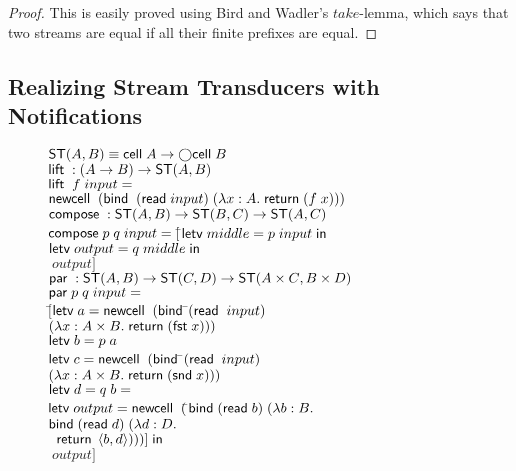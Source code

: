 \begin{proof}
  This is easily proved using Bird and Wadler's $take$-lemma, which
  says that two streams are equal if all their finite prefixes are
  equal.
\end{proof}


\subsection{Realizing Stream Transducers with Notifications}

\begin{figure}
\mbox{}
\begin{tabbing}
$\mathsf{ST}({A}, {B}) \equiv \mathsf{cell}\;{A} \to \bigcirc{\mathsf{cell}\;{B}}$ \\[1em]

$\mathsf{lift}\; : (A \to B) \to \mathsf{ST}({A}, {B})$ \\
$\mathsf{lift}\;\;f\;input = $ \\
\;\; $\mathsf{newcell}\;\; (\mathsf{bind}\;\;(\mathsf{read}\; input)\; (\lambda x:A.\;\mathsf{return}\; (f\;x)))$ \\[1em]

$\mathsf{compose}\; : \mathsf{ST}({A}, {B}) \to \mathsf{ST}({B}, {C}) \to \mathsf{ST}({A}, {C})$ \\
$\mathsf{compose}\; p\;q\;input = [$\=$\letv{middle}{p\;input}$ \\
                            \>$\letv{output}{q\;middle}$ \\ 
                            \>$\;output]$ \\[1em]

$\mathsf{par}\; : \mathsf{ST}({A}, {B}) \to \mathsf{ST}({C}, {D}) \to \mathsf{ST}({A \times C}, {B \times D})$ \\
$\mathsf{par}\; p \; q \; input = $ \\
\;\;$[$\=$\mathsf{letv}\;a = \mathsf{newcell}\;\; (\mathsf{bind}\;$\=$(\mathsf{read}\;\;input)$ \\
     \>                                   \>$(\lambda x:A\times B.\;\mathsf{return}\; (\mathsf{fst}\; x)))$ \\
     \>$\mathsf{letv}\;b = {p\;a}{}$ \\
     \>$\mathsf{letv}\;c = \mathsf{newcell}\;\; (\mathsf{bind}\;$\=$(\mathsf{read}\;\;input)\;$\\ 
     \>                                   \>$(\lambda x:A\times B.\;\mathsf{return}\; (\mathsf{snd}\; x)))$ \\
     \>$\mathsf{letv}\;d = {q\;b} = $ \\
     \>$\mathsf{letv}\;output = \mathsf{newcell}\;\; ($\=$\mathsf{bind}\; (\mathsf{read}\; b)\; (\lambda b:B.$ \\
     \>                                   \>$\mathsf{bind}\; (\mathsf{read}\; d)\; (\lambda d:D.$ \\
     \>                                   \>$\;\;\mathsf{return}\; \left<{b},{d}\right>)))] \;\mathsf{in}$ \\
     \>$\;output]$ \\[1em]


\end{tabbing}
\end{figure}
